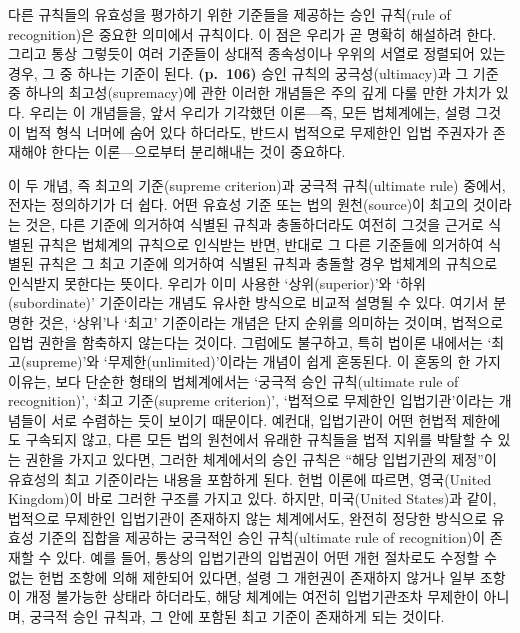 다른 규칙들의 유효성을 평가하기 위한 기준들을 제공하는 승인 규칙(rule of
recognition)은 중요한 의미에서  규칙이다. 이 점은
우리가 곧 명확히 해설하려 한다. 그리고 통상 그렇듯이 여러 기준들이
상대적 종속성이나 우위의 서열로 정렬되어 있는 경우, 그 중 하나는
 기준이 된다. \textbf{(p.~106)} 승인 규칙의
궁극성(ultimacy)과 그 기준 중 하나의 최고성(supremacy)에 관한 이러한
개념들은 주의 깊게 다룰 만한 가치가 있다. 우리는 이 개념들을, 앞서
우리가 기각했던 이론---즉, 모든 법체계에는, 설령 그것이 법적 형식 너머에
숨어 있다 하더라도, 반드시 법적으로 무제한인 입법 주권자가 존재해야
한다는 이론---으로부터 분리해내는 것이 중요하다.

이 두 개념, 즉 최고의 기준(supreme criterion)과 궁극적 규칙(ultimate
rule) 중에서, 전자는 정의하기가 더 쉽다. 어떤 유효성 기준 또는 법의
원천(source)이 최고의 것이라는 것은, 다른 기준에 의거하여 식별된 규칙과
충돌하더라도 여전히 그것을 근거로 식별된 규칙은 법체계의 규칙으로
인식받는 반면, 반대로 그 다른 기준들에 의거하여 식별된 규칙은 그 최고
기준에 의거하여 식별된 규칙과 충돌할 경우 법체계의 규칙으로 인식받지
못한다는 뜻이다. 우리가 이미 사용한 `상위(superior)'와
`하위(subordinate)' 기준이라는 개념도 유사한 방식으로 비교적 설명될 수
있다. 여기서 분명한 것은, `상위'나 `최고' 기준이라는 개념은 단지
 순위를 의미하는 것이며, 법적으로
 입법 권한을 함축하지 않는다는 것이다.
그럼에도 불구하고, 특히 법이론 내에서는 `최고(supreme)'와
`무제한(unlimited)'이라는 개념이 쉽게 혼동된다. 이 혼동의 한 가지
이유는, 보다 단순한 형태의 법체계에서는 `궁극적 승인 규칙(ultimate rule
of recognition)', `최고 기준(supreme criterion)', `법적으로 무제한인
입법기관'이라는 개념들이 서로 수렴하는 듯이 보이기 때문이다. 예컨대,
입법기관이 어떤 헌법적 제한에도 구속되지 않고, 다른 모든 법의 원천에서
유래한 규칙들을 법적 지위를 박탈할 수 있는 권한을 가지고 있다면, 그러한
체계에서의 승인 규칙은 ``해당 입법기관의 제정''이 유효성의 최고
기준이라는 내용을 포함하게 된다. 헌법 이론에 따르면, 영국(United
Kingdom)이 바로 그러한 구조를 가지고 있다. 하지만, 미국(United States)과
같이, 법적으로 무제한인 입법기관이 존재하지 않는 체계에서도, 완전히
정당한 방식으로 유효성 기준의 집합을 제공하는 궁극적인 승인
규칙(ultimate rule of recognition)이 존재할 수 있다. 예를 들어, 통상의
입법기관의 입법권이 어떤 개헌 절차로도 수정할 수 없는 헌법 조항에 의해
제한되어 있다면, 설령 그 개헌권이 존재하지 않거나 일부 조항이 개정
불가능한 상태라 하더라도, 해당 체계에는 여전히 입법기관조차 무제한이
아니며, 궁극적 승인 규칙과, 그 안에 포함된 최고 기준이 존재하게 되는
것이다.

